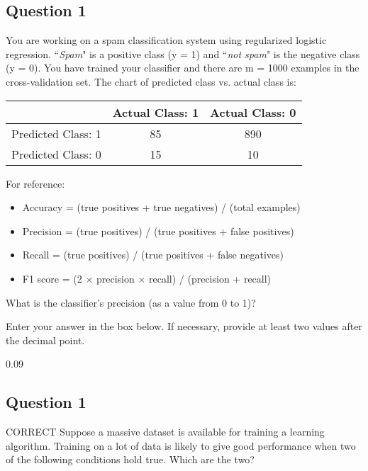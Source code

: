 \documentclass[11pt]{article} %
\begin{document}
\subsection*{Question 1} 
You are working on a spam classification system using regularized logistic regression. ``\textit{Spam}" is a positive class (y = 1) and ``\textit{not spam}" is the negative class (y = 0). You have trained your classifier and there are m = 1000 examples in the cross-validation set. The chart of predicted class vs. actual class is:

\begin{center}
\begin{tabular}{|c|c|c|}\hline 
	& Actual Class: 1	& Actual Class: 0 \\ \hline
	Predicted Class: 1 &	85&	890 \\  \hline  
	Predicted Class: 0 &	15&	10\\ \hline
\end{tabular} 
\end{center}


\begin{framed}
For reference:

\begin{itemize}
	\item Accuracy = (true positives + true negatives) / (total examples)
	\item Precision = (true positives) / (true positives + false positives)
	\item Recall = (true positives) / (true positives + false negatives)
	\item F1 score = (2 $\times$ precision $\times$ recall) / (precision + recall)
\end{itemize}

\end{framed}
What is the classifier's precision (as a value from 0 to 1)?

Enter your answer in the box below. If necessary, provide at least two values after the decimal point.

0.09
\subsection{Question 1} 
CORRECT
Suppose a massive dataset is available for training a learning algorithm. Training on a lot of data is likely to give good performance when two of the following conditions hold true. Which are the two?
\end{document}
